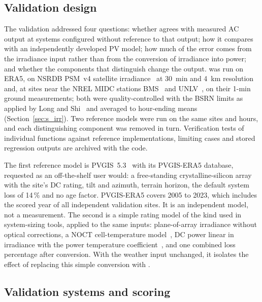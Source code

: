 \documentclass[11pt]{article}
\begin{document}
\subsection{Validation design}
\label{sec:design}

The validation addressed four questions: whether \RePV{} agrees with measured AC output at systems configured without reference to that output; how it compares with an independently developed PV model; how much of the error comes from the irradiance input rather than from the conversion of irradiance into power; and whether the components that distinguish \RePV{} change the output. \RePV{} was run on ERA5, on NSRDB PSM~v4 satellite irradiance~\cite{sengupta2018nsrdb} at 30~min and 4~km resolution and, at sites near the NREL MIDC stations BMS~\cite{andreasStoffel1981bms} and UNLV~\cite{andreasStoffel2006unlv}, on their 1-min ground measurements; both were quality-controlled with the BSRN limits as applied by Long and Shi~\cite{longShi2008qcrad} and averaged to hour-ending means (Section~\ref{sec:s_irr}). Two reference models were run on the same sites and hours, and each distinguishing component was removed in turn. Verification tests of individual functions against reference implementations, limiting cases and stored regression outputs are archived with the code.

The first reference model is PVGIS~5.3~\cite{huldNewSolarRadiation2012} with its PVGIS-ERA5 database, requested as an off-the-shelf user would: a free-standing crystalline-silicon array with the site's DC rating, tilt and azimuth, terrain horizon, the default system loss of 14\,\% and no age factor. PVGIS-ERA5 covers 2005 to 2023, which includes the scored year of all \vNPvgis{} independent validation sites. It is an independent model, not a measurement. The second is a simple rating model of the kind used in system-sizing tools, applied to the same inputs: plane-of-array irradiance without optical corrections, a NOCT cell-temperature model~\cite{duffieBeckman1991}, DC power linear in irradiance with the power temperature coefficient~\cite{dobosPVWattsVersion52014}, and one combined loss percentage after conversion. With the weather input unchanged, it isolates the effect of replacing this simple conversion with \RePV{}.

\subsection{Validation systems and scoring}
\label{sec:sites}
\end{document}
